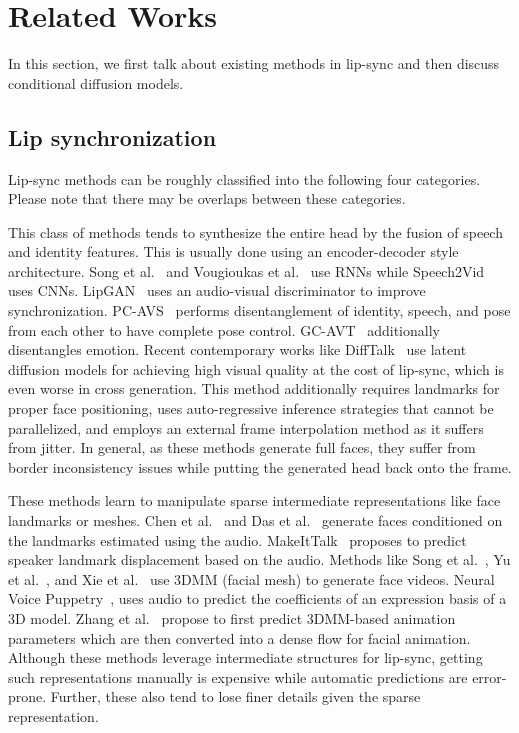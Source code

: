 
\section{Related Works}
In this section, we first talk about existing methods in lip-sync and then discuss conditional diffusion models. 
\subsection{Lip synchronization}
Lip-sync methods can be roughly classified into the following four categories.  Please note that there may be overlaps between these categories. 


\label{sec:head-based}
This class of methods tends to synthesize the entire head by the fusion of speech and identity features. This is usually done using an encoder-decoder style architecture. Song et al.~\cite{song2018talking} and Vougioukas et al.~\cite{vougioukas2018end} use RNNs while Speech2Vid~\cite{speech2vid} uses CNNs. LipGAN~\cite{kr2019towards} uses an audio-visual discriminator to improve synchronization. PC-AVS~\cite{pcavs} performs disentanglement of identity, speech, and pose from each other to have complete pose control. GC-AVT~\cite{gcavt} additionally disentangles emotion. Recent contemporary works like DiffTalk~\cite{shen2023difftalk} use latent diffusion models for achieving high visual quality at the cost of lip-sync, which is even worse in cross generation. This method additionally requires landmarks for proper face positioning, uses auto-regressive inference strategies that cannot be parallelized, and employs an external frame interpolation method as it suffers from jitter. In general, as these methods generate full faces, they suffer from border inconsistency issues while putting the generated head back onto the frame.

\label{sec:2d3d}
These methods learn to manipulate sparse intermediate representations like face landmarks or meshes. Chen et al.~\cite{chen2019hierarchical} and Das et al.~\cite{das2020speech} generate faces conditioned on the landmarks estimated using the audio. MakeItTalk~\cite{makeittalk} proposes to predict speaker landmark displacement based on the audio. 
Methods like Song et al.~\cite{song2022everybody}, Yu et al.~\cite{yu2020multimodal}, and Xie et al.~\cite{xie2021towards} use 3DMM (facial mesh) to generate face videos. Neural Voice Puppetry~\cite{thies2020neural}, uses audio to predict the coefficients of an expression basis of a 3D model. Zhang et al.~\cite{zhang2021flow} propose to first predict 3DMM-based animation parameters which are then converted into a dense flow for facial animation. Although these methods leverage intermediate structures for lip-sync, getting such representations manually is expensive while automatic predictions are error-prone. Further, these also tend to lose finer details given the sparse representation.

